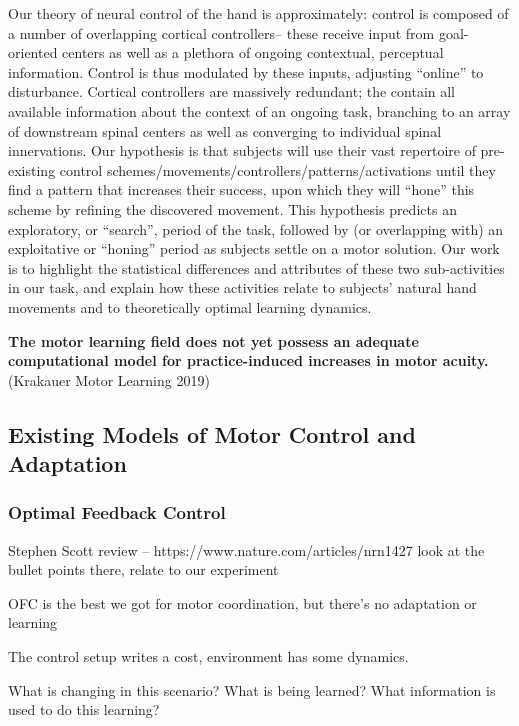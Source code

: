 \documentclass[../main.tex]{subfiles}
\begin{document}
Our theory of neural control of the hand is approximately: control is composed of a number of overlapping cortical controllers– these receive input from goal-oriented centers as well as a plethora of ongoing contextual, perceptual information. Control is thus modulated by these inputs, adjusting “online” to disturbance. Cortical controllers are massively redundant; the contain all available information about the context of an ongoing task, branching to an array of downstream spinal centers as well as converging to individual spinal innervations. Our hypothesis is that subjects will use their vast repertoire of pre-existing control schemes/movements/controllers/patterns/activations until they find a pattern that increases their success, upon which they will “hone” this scheme by refining the discovered movement. This hypothesis predicts an exploratory, or “search”, period of the task, followed by (or overlapping with) an exploitative or “honing” period as subjects settle on a motor solution. Our work is to highlight the statistical differences and attributes of these two sub-activities in our task, and explain how these activities relate to subjects’ natural hand movements and to theoretically optimal learning dynamics.


\textbf{The motor learning field does not yet possess an adequate
computational model for practice-induced increases in motor acuity.}
(Krakauer Motor Learning 2019)

\subsection{Existing Models of Motor Control and
Adaptation}\label{existing-models-of-motor-control-and-adaptation}

\subsubsection{Optimal Feedback Control}\label{optimal-feedback-control}

Stephen Scott review -- https://www.nature.com/articles/nrn1427 look at
the bullet points there, relate to our experiment

OFC is the best we got for motor coordination, but there's no adaptation
or learning

The control setup writes a cost, environment has some dynamics.

What is changing in this scenario? What is being learned? What
information is used to do this learning?
\end{document}
